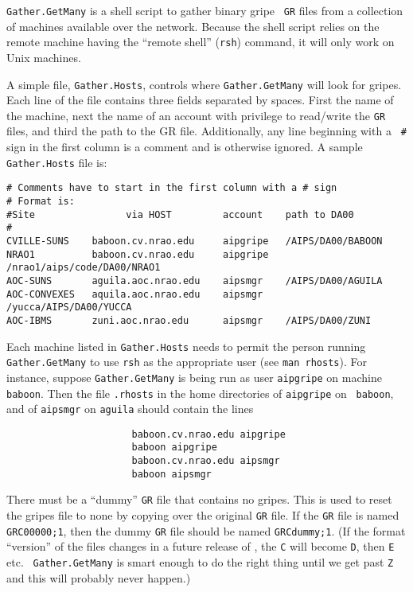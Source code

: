 {\tt Gather.GetMany} is a shell script to gather binary gripe \AIPS\
{\tt GR} files from a collection of machines available over the
network.  Because the shell script relies on the remote machine having
the ``remote shell'' ({\tt rsh}) command, it will only work on Unix
machines.

A simple file, {\tt Gather.Hosts}, controls where {\tt Gather.GetMany}
will look for gripes.  Each line of the file contains three fields
separated by spaces.   First the name of the machine, next the name of
an account with privilege to read/write the {\tt GR} files, and third
the path to the GR file.  Additionally, any line beginning with a {\tt
\#} sign in the first column is a comment and is otherwise ignored.
A sample {\tt Gather.Hosts} file is:
\begin{verbatim}
# Comments have to start in the first column with a # sign
# Format is:
#Site                via HOST         account    path to DA00
#
CVILLE-SUNS    baboon.cv.nrao.edu     aipgripe   /AIPS/DA00/BABOON
NRAO1          baboon.cv.nrao.edu     aipgripe   /nrao1/aips/code/DA00/NRAO1
AOC-SUNS       aguila.aoc.nrao.edu    aipsmgr    /AIPS/DA00/AGUILA
AOC-CONVEXES   aquila.aoc.nrao.edu    aipsmgr    /yucca/AIPS/DA00/YUCCA
AOC-IBMS       zuni.aoc.nrao.edu      aipsmgr    /AIPS/DA00/ZUNI
\end{verbatim}

Each machine listed in {\tt Gather.Hosts} needs to permit the person
running {\tt Gather.GetMany} to use {\tt rsh} as the appropriate user
(see {\tt man rhosts}).  For instance, suppose {\tt Gather.GetMany} is
being run as user {\tt aipgripe} on machine {\tt baboon}.  Then the
file {\tt .rhosts} in the home directories of {\tt aipgripe} on {\tt
baboon}, and of {\tt aipsmgr} on {\tt aguila} should contain the lines
\begin{verbatim}
                      baboon.cv.nrao.edu aipgripe
                      baboon aipgripe
                      baboon.cv.nrao.edu aipsmgr
                      baboon aipsmgr
\end{verbatim}

There must be a ``dummy'' {\tt GR} file that contains no gripes.  This
is used to reset the gripes file to none by copying over the original
{\tt GR} file.  If the {\tt GR} file is named {\tt GRC00000;1}, then
the dummy {\tt GR} file should be named \hbox{{\tt GRCdummy;1}}.  (If
the format ``version'' of the files changes in a future release of
\AIPS, the {\tt C} will become {\tt D}, then {\tt E} etc.  {\tt
Gather.GetMany} is smart enough to do the right thing until we get
past {\tt Z} and this will probably never happen.)

